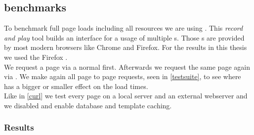 \subsection{\selenium{} benchmarks\label{selenium}}

To benchmark full page loads including all resources we are using \selenium{}.
This \emph{record and play} tool builds an interface for a usage of multiple \webdriver{}s.
Those \webdriver{}s are provided by most modern browsers like Chrome and Firefox.
For the results in this thesis we used the Firefox \webdriver{}.
\\
We request a page via a normal \httpRequest{} first.
Afterwards we request the same page again via \lare{}.
We make again all page to page requests, seen in \ref{testsuite}, to see where \lare{} has a bigger or smaller effect on the load times.
\\
Like in \ref{curl} we test every page on a local server and an external webserver and we disabled and enable database and template caching.

\subsubsection{Results}

